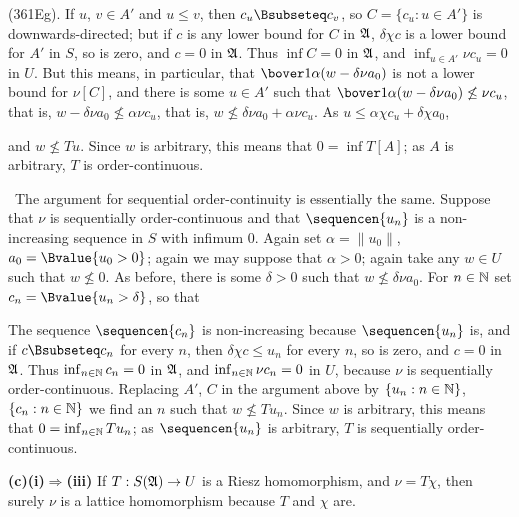 {

\noindent (361Eg).   If $u$, $v\in A'$ and $u\le v$, then
$c_u\Bsubseteq c_v$, so $C=\{c_u:u\in A'\}$ is downwards-directed;  but if $c$ is any
lower bound for $C$ in $\frak A$, $\delta\chi c$ is a lower bound for
$A'$ in $S$, so is zero, and $c=0$ in $\frak A$.   Thus $\inf C=0$ in
$\frak A$, and $\inf_{u\in A'}\nu c_u=0$ in $U$.   But this means, in
particular, that $\bover1{\alpha}(w-\delta\nu a_0)$ is not a lower bound
for $\nu[C]$, and there is some $u\in A'$ such that
$\bover1{\alpha}(w-\delta\nu a_0)\not\le\nu c_u$, that is,
$w-\delta\nu a_0\not\le\alpha\nu c_u$, that is,
$w\not\le\delta\nu a_0+\alpha\nu c_u$.
As $u\le\alpha\chi c_u+\delta\chi a_0$,


\noindent and $w\not\le Tu$.   Since $w$ is arbitrary, this means that
$0=\inf T[A]$;  as $A$ is arbitrary, $T$ is order-continuous.

\medskip

\qquad\grheadb\ The argument for sequential order-continuity is
essentially the same.   Suppose that $\nu$ is sequentially
order-continuous and that $\sequencen{u_n}$ is a non-increasing sequence
in $S$ with infimum $0$.   Again set $\alpha=\|u_0\|$,
$a_0=\Bvalue{u_0>0}$;  again we may suppose that $\alpha>0$;  again take
any $w\in U$ such that $w\not\le 0$.   As before, there is some
$\delta>0$ such that $w\not\le\delta\nu a_0$.   For $n\in\Bbb N$ set
$c_n=\Bvalue{u_n>\delta}$, so that


\noindent   The sequence $\sequencen{c_n}$ is non-increasing because
$\sequencen{u_n}$ is,  and if $c\Bsubseteq c_n$ for every $n$, then
$\delta\chi c\le u_n$ for every $n$, so is zero, and $c=0$ in $\frak A$.
Thus $\inf_{n\in\Bbb N}c_n=0$ in $\frak A$, and
$\inf_{n\in\Bbb N}\nu c_n=0$ in $U$, because $\nu$ is sequentially order-continuous.
Replacing $A'$, $C$ in the argument above by $\{u_n:n\in\Bbb N\}$,
$\{c_n:n\in\Bbb N\}$ we find an $n$ such that $w\not\le Tu_n$.   Since
$w$ is arbitrary, this means that
$0=\inf_{n\in\Bbb N}Tu_n$;  as $\sequencen{u_n}$ is arbitrary, $T$ is
sequentially order-continuous.

\medskip

{\bf (c)(i)$\Rightarrow$(iii)} If $T:S(\frak A)\to U$ is a Riesz
homomorphism, and
$\nu=T\chi$, then surely $\nu$ is a lattice homomorphism because $T$ and
$\chi$ are.

}
